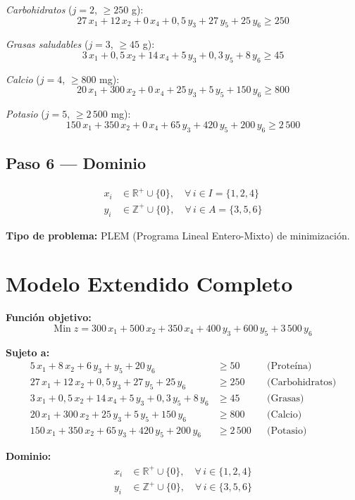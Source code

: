 \documentclass[12pt]{article}
\begin{document}
\textit{Carbohidratos} ($j = 2$, $\geq 250$ g):
\[
    27\,x_1 + 12\,x_2 + 0\,x_4 + 0{,}5\,y_3 + 27\,y_5 + 25\,y_6 \geq 250
\]

\textit{Grasas saludables} ($j = 3$, $\geq 45$ g):
\[
    3\,x_1 + 0{,}5\,x_2 + 14\,x_4 + 5\,y_3 + 0{,}3\,y_5 + 8\,y_6 \geq 45
\]

\textit{Calcio} ($j = 4$, $\geq 800$ mg):
\[
    20\,x_1 + 300\,x_2 + 0\,x_4 + 25\,y_3 + 5\,y_5 + 150\,y_6 \geq 800
\]

\textit{Potasio} ($j = 5$, $\geq 2\,500$ mg):
\[
    150\,x_1 + 350\,x_2 + 0\,x_4 + 65\,y_3 + 420\,y_5 + 200\,y_6 \geq 2\,500
\]

\subsection{Paso 6 --- Dominio}

\begin{align*}
    x_i &\in \mathbb{R}^+ \cup \{0\}, \quad \forall\, i \in I = \{1, 2, 4\} \\
    y_i &\in \mathbb{Z}^+ \cup \{0\}, \quad \forall\, i \in A = \{3, 5, 6\}
\end{align*}

\textbf{Tipo de problema:} PLEM (Programa Lineal Entero-Mixto) de minimizaci\'on.

\section{Modelo Extendido Completo}

\begin{mdframed}[backgroundcolor=gray!5, linewidth=1.5pt]
\textbf{Funci\'on objetivo:}
\[
    \text{Min}\; z = 300\,x_1 + 500\,x_2 + 350\,x_4
    + 400\,y_3 + 600\,y_5 + 3\,500\,y_6
\]

\textbf{Sujeto a:}
\begin{align*}
    5\,x_1 + 8\,x_2 + 6\,y_3 + y_5 + 20\,y_6 &\geq 50   && \text{(Prote\'ina)} \\
    27\,x_1 + 12\,x_2 + 0{,}5\,y_3 + 27\,y_5 + 25\,y_6 &\geq 250 && \text{(Carbohidratos)} \\
    3\,x_1 + 0{,}5\,x_2 + 14\,x_4 + 5\,y_3 + 0{,}3\,y_5 + 8\,y_6 &\geq 45  && \text{(Grasas)} \\
    20\,x_1 + 300\,x_2 + 25\,y_3 + 5\,y_5 + 150\,y_6 &\geq 800  && \text{(Calcio)} \\
    150\,x_1 + 350\,x_2 + 65\,y_3 + 420\,y_5 + 200\,y_6 &\geq 2\,500 && \text{(Potasio)}
\end{align*}

\textbf{Dominio:}
\begin{align*}
    x_i &\in \mathbb{R}^+ \cup \{0\}, \quad \forall\, i \in \{1, 2, 4\} \\
    y_i &\in \mathbb{Z}^+ \cup \{0\}, \quad \forall\, i \in \{3, 5, 6\}
\end{align*}
\end{mdframed}
\end{document}
